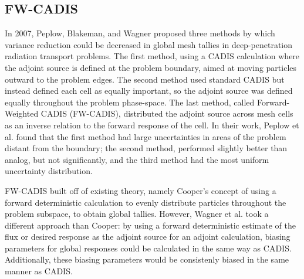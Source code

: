 \subsection{FW-CADIS}
\label{subsec:FWCADIS}

In 2007, Peplow, Blakeman, and Wagner \cite{peplow_advanced_2007} proposed three
methods by which variance reduction could be decreased in global mesh tallies in
deep-penetration radiation transport problems. The first method, using a CADIS
calculation where the adjoint source is defined at the problem boundary, aimed
at moving particles outward to the problem edges.
The second method used standard CADIS but instead
defined each cell as equally important, so the adjoint source was defined
equally throughout the problem phase-space. The last method, called Forward-Weighted
CADIS (FW-CADIS), distributed the adjoint source across mesh cells as an inverse
relation to the forward response of the cell. In their work, Peplow et al. found
that the first method had large uncertainties in areas of the problem distant
from the boundary; the second method, performed slightly better than analog, but
not significantly, and the third method had the most uniform uncertainty
distribution.

FW-CADIS
\cite{wagner_forward-weighted_2007,wagner_forward-weighted_2009,wagner_forward-weighted_2010}
built off of existing theory, namely Cooper's
concept of using a forward deterministic calculation to evenly distribute
particles throughout the problem subspace, to obtain global tallies. However,
Wagner et al. took a different approach than Cooper: by using a forward
deterministic estimate of the flux or desired response as the adjoint source for
an adjoint calculation, biasing parameters for global responses could be
calculated in the same way as CADIS. Additionally, these biasing parameters
would be consistenly biased in the same manner as CADIS.

